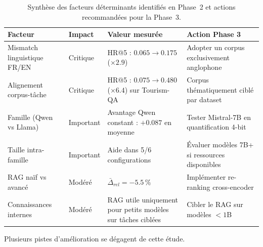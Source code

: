 \documentclass[12pt,a4paper]{article}
\begin{document}
\begin{table}[H]
\centering
\small 
\caption{Synthèse des facteurs déterminants identifiés en Phase~2 et actions 
recommandées pour la Phase~3.}
\label{tab:facteurs_phase3}
\renewcommand{\arraystretch}{1.3}
\begin{tabular}{p{3.8cm}lp{3.5cm}p{4cm}}
\toprule
\textbf{Facteur} & \textbf{Impact} & \textbf{Valeur mesurée} & 
\textbf{Action Phase 3} \\
\midrule
Mismatch linguistique FR/EN & Critique & 
    HR@5 : $0.065 \to 0.175$ ($\times 2.9$) & 
    Adopter un corpus exclusivement anglophone \\
Alignement corpus-tâche & Critique & 
    HR@5 : $0.075 \to 0.480$ ($\times 6.4$) sur Tourism-QA & 
    Corpus thématiquement ciblé par dataset \\
Famille (Qwen vs Llama) & Important & 
    Avantage Qwen constant : $+0.087$ en moyenne & 
    Tester Mistral-7B en quantification 4-bit \\
Taille intra-famille & Important & 
    Aide dans 5/6 configurations & 
    Évaluer modèles 7B+ si ressources disponibles \\
RAG naïf vs avancé & Modéré & 
    $\bar{\Delta}_{rel} = -5.5$\,\% & 
    Implémenter re-ranking cross-encoder \\
Connaissances internes & Modéré & 
    RAG utile uniquement pour petits modèles sur tâches ciblées & 
    Cibler le RAG sur modèles $< 1$B \\
\bottomrule
\end{tabular}
\end{table}

\medskip

Plusieurs pistes d'am\'elioration se d\'egagent de cette \'etude.
\end{document}
